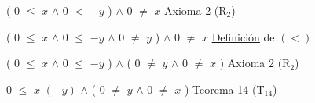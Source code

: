 \documentclass[12pt]{article}
\begin{document}
(\hspace{0.2cm} $0$ $\leq$ $x$ \hspace{0.2cm} $\wedge$ \hspace{0.2cm} $0$ $<$ $-y$ \hspace{0.2cm} )  \hspace{0.2cm} $\wedge$ \hspace{0.2cm} $0$ $\neq$ $x$ \hspace{3.3cm} {\textcolor{carrotorange}{ Axioma 2 (R$_{2}$)}} \vspace{0.5cm}

( \hspace{0.2cm} $0$ $\leq$ $x$ \hspace{0.2cm} $\wedge$ \hspace{0.2cm} $0$ $\leq$ $-y$ \hspace{0.2cm} $\wedge$ \hspace{0.2cm} $0$ $\neq$ $y$ \hspace{0.2cm} )  \hspace{0.2cm} $\wedge$ \hspace{0.2cm} $0$ $\neq$ $x$ \hspace{0.4cm} {\textcolor{carrotorange}{{\underline{Definición} de $(<)$}}} \vspace{0.5cm}

( \hspace{0.2cm} $0$ $\leq$ $x$ \hspace{0.2cm} $\wedge$ \hspace{0.2cm} $0$ $\leq$ $-y$ \hspace{0.2cm} ) \hspace{0.2cm}  $\wedge$ \hspace{0.2cm} ( \hspace{0.2cm} $0$ $\neq$ $y$ \hspace{0.2cm} $\wedge$ \hspace{0.2cm} $0$ $\neq$ $x$ \hspace{0.2cm} ) \hspace{0.4cm} {\textcolor{carrotorange}{Axioma 2 (R$_{2}$)}} \vspace{0.5cm}

$0$ $\leq$ $x$ $(-y)$  \hspace{0.2cm}  $\wedge$ \hspace{0.2cm} ( \hspace{0.2cm} $0$ $\neq$ $y$ \hspace{0.2cm} $\wedge$ \hspace{0.2cm} $0$ $\neq$ $x$ \hspace{0.2cm} ) \hspace{3.8cm} {\textcolor{carrotorange}{Teorema 14 (T$_{14}$)}} \vspace{0.5cm}
\end{document}
